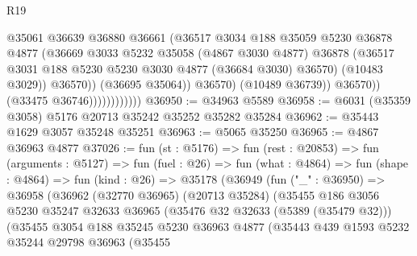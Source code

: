 \begin{lexlean}{R19}
\begin{coremodule}
                                      @35061
                                      @36639
                                      @36880
                                      @36661
                                      (@36517
                                        @3034
                                        @188
                                        @35059
                                        @5230
                                        @36878
                                        @4877
                                        (@36669
                                          @3033
                                          @5232
                                          @35058
                                          (@4867 @3030 @4877)
                                          @36878
                                          (@36517
                                            @3031
                                            @188
                                            @5230
                                            @5230
                                            @3030
                                            @4877
                                            (@36684 @3030)
                                            @36570)
                                          (@10483 @3029))
                                        @36570))
                                    (@36695 @35064))
                                  @36570)
                                (@10489 @36739))
                              @36570))
                          (@33475 @36746))))))))))))
@36950 := @34963 @5589
@36958 := @6031 (@35359 @3058) @5176 @20713 @35242 @35252 @35282 @35284
@36962 := @35443 @1629 @3057 @35248 @35251
@36963 := @5065 @35250
@36965 := @4867 @36963 @4877
@37026 := fun (st : @5176) =>
  fun (rest : @20853) =>
  fun (arguments : @5127) =>
  fun (fuel : @26) =>
  fun (what : @4864) =>
  fun (shape : @4864) =>
  fun (kind : @26) =>
  @35178
    (@36949
      (fun ("_" : @36950) =>
      @36958
        (@36962
          (@32770 @36965)
          (@20713 @35284)
          (@35455
            @186
            @3056
            @5230
            @35247
            @32633
            @36965
            (@35476 @32 @32633 (@5389 (@35479 @32)))
            (@35455
              @3054
              @188
              @35245
              @5230
              @36963
              @4877
              (@35443
                @439
                @1593
                @5232
                @35244
                @29798
                @36963
                (@35455

\end{coremodule}
\end{lexlean}
